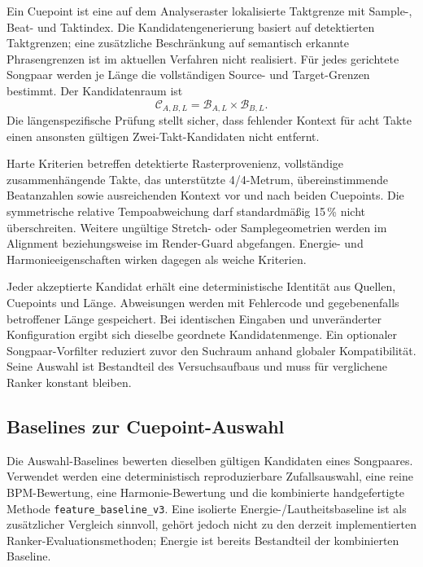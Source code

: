 Ein Cuepoint ist eine auf dem Analyseraster lokalisierte Taktgrenze mit Sample-, Beat- und Taktindex. Die Kandidatengenerierung basiert auf detektierten Taktgrenzen; eine zusätzliche Beschränkung auf semantisch erkannte Phrasengrenzen ist im aktuellen Verfahren nicht realisiert. Für jedes gerichtete Songpaar werden je Länge die vollständigen Source- und Target-Grenzen bestimmt. Der Kandidatenraum ist
\begin{equation}
 \mathcal{C}_{A,B,L}=\mathcal{B}_{A,L}\times\mathcal{B}_{B,L}.
\end{equation}
Die längenspezifische Prüfung stellt sicher, dass fehlender Kontext für acht Takte einen ansonsten gültigen Zwei-Takt-Kandidaten nicht entfernt.

Harte Kriterien betreffen detektierte Rasterprovenienz, vollständige zusammenhängende Takte, das unterstützte 4/4-Metrum, übereinstimmende Beatanzahlen sowie ausreichenden Kontext vor und nach beiden Cuepoints. Die symmetrische relative Tempoabweichung darf standardmäßig 15\,\% nicht überschreiten. Weitere ungültige Stretch- oder Samplegeometrien werden im Alignment beziehungsweise im Render-Guard abgefangen. Energie- und Harmonieeigenschaften wirken dagegen als weiche Kriterien.

Jeder akzeptierte Kandidat erhält eine deterministische Identität aus Quellen, Cuepoints und Länge. Abweisungen werden mit Fehlercode und gegebenenfalls betroffener Länge gespeichert. Bei identischen Eingaben und unveränderter Konfiguration ergibt sich dieselbe geordnete Kandidatenmenge. Ein optionaler Songpaar-Vorfilter reduziert zuvor den Suchraum anhand globaler Kompatibilität. Seine Auswahl ist Bestandteil des Versuchsaufbaus und muss für verglichene Ranker konstant bleiben.

\subsection{Baselines zur Cuepoint-Auswahl}
\label{sec:methodik-auswahlbaselines}

Die Auswahl-Baselines bewerten dieselben gültigen Kandidaten eines Songpaares. Verwendet werden eine deterministisch reproduzierbare Zufallsauswahl, eine reine BPM-Bewertung, eine Harmonie-Bewertung und die kombinierte handgefertigte Methode \texttt{feature\_baseline\_v3}. Eine isolierte Energie-/Lautheitsbaseline ist als zusätzlicher Vergleich sinnvoll, gehört jedoch nicht zu den derzeit implementierten Ranker-Evaluationsmethoden; Energie ist bereits Bestandteil der kombinierten Baseline.

